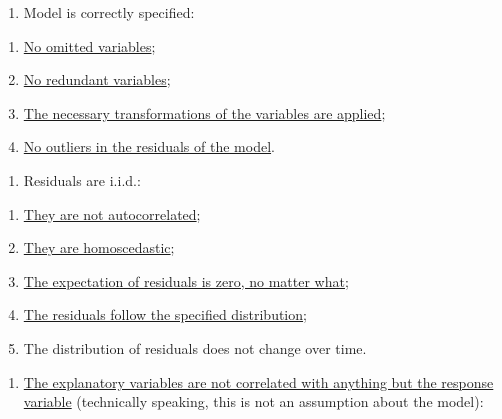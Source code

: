 \documentclass[]{book}
\providecommand{\tightlist}{%
  \setlength{\itemsep}{0pt}\setlength{\parskip}{0pt}}
\theoremstyle{definition}
\theoremstyle{definition}
\theoremstyle{definition}
\theoremstyle{definition}
\theoremstyle{remark}
\begin{document}
\begin{enumerate}
\def\labelenumi{\arabic{enumi}.}
\tightlist
\item
  Model is correctly specified:
\end{enumerate}

\begin{enumerate}
\def\labelenumi{\alph{enumi}.}
\tightlist
\item
  \protect\hyperlink{diagnosticsOmitted}{No omitted variables};
\item
  \protect\hyperlink{diagnosticsRedundant}{No redundant variables};
\item
  \protect\hyperlink{diagnosticsTransformations}{The necessary transformations of the variables are applied};
\item
  \protect\hyperlink{diagnosticsOutliers}{No outliers in the residuals of the model}.
\end{enumerate}

\begin{enumerate}
\def\labelenumi{\arabic{enumi}.}
\setcounter{enumi}{1}
\tightlist
\item
  Residuals are i.i.d.:
\end{enumerate}

\begin{enumerate}
\def\labelenumi{\alph{enumi}.}
\tightlist
\item
  \protect\hyperlink{diagnosticsResidualsIIDAuto}{They are not autocorrelated};
\item
  \protect\hyperlink{diagnosticsResidualsIIDHetero}{They are homoscedastic};
\item
  \protect\hyperlink{diagnosticsResidualsIIDExpectation}{The expectation of residuals is zero, no matter what};
\item
  \protect\hyperlink{diagnosticsResidualsIIDDistribution}{The residuals follow the specified distribution};
\item
  The distribution of residuals does not change over time.
\end{enumerate}

\begin{enumerate}
\def\labelenumi{\arabic{enumi}.}
\setcounter{enumi}{2}
\tightlist
\item
  \protect\hyperlink{diagnosticsMulticollinearity}{The explanatory variables are not correlated with anything but the response variable} (technically speaking, this is not an assumption about the model):
\end{enumerate}
\end{document}
